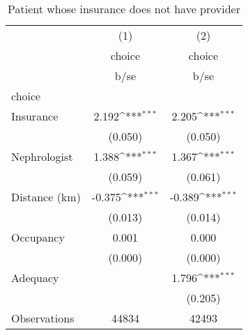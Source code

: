 \begin{table}[htbp]\centering
\def\sym#1{\ifmmode^{#1}\else\(^{#1}\)\fi}
\caption{Patient whose insurance does not have provider}
\begin{tabular}{l*{2}{c}}
\hline\hline
                    &\multicolumn{1}{c}{(1)}&\multicolumn{1}{c}{(2)}\\
                    &\multicolumn{1}{c}{choice}&\multicolumn{1}{c}{choice}\\
                    &        b/se         &        b/se         \\
\hline
choice              &                     &                     \\
Insurance           &       2.192\sym{***}&       2.205\sym{***}\\
                    &     (0.050)         &     (0.050)         \\
Nephrologist        &       1.388\sym{***}&       1.367\sym{***}\\
                    &     (0.059)         &     (0.061)         \\
Distance (km)       &      -0.375\sym{***}&      -0.389\sym{***}\\
                    &     (0.013)         &     (0.014)         \\
Occupancy           &       0.001         &       0.000         \\
                    &     (0.000)         &     (0.000)         \\
Adequacy            &                     &       1.796\sym{***}\\
                    &                     &     (0.205)         \\
\hline
Observations        &       44834         &       42493         \\
\hline\hline
\end{tabular}
\end{table}
